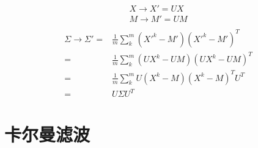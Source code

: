 \begin{gather}
    X\rightarrow X'=UX\\
    M\rightarrow M'=UM\\
\end{gather}
\begin{align}
    \Sigma \rightarrow \Sigma'
    =& \frac{1}{m} \sum_{k}^{m} (X'^{k}-M')(X'^{k}-M')^{T}\\
    =& \frac{1}{m} \sum_{k}^{m} (UX^{k}-UM)(UX^{k}-UM)^{T}\\
    =& \frac{1}{m} \sum_{k}^{m} U(X^{k}-M)(X^{k}-M)^{T}U^{T}\\
    =& U \Sigma U^{T}
\end{align}

\section{卡尔曼滤波}
